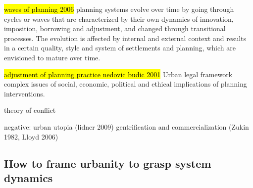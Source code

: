 \documentclass[11pt]{report}
\begin{document}
 	\hl{waves of planning 2006}
planning systems evolve over time by going through cycles or waves that are characterized  by  their  own  dynamics  of  innovation,  imposition,  borrowing  and  adjustment,  and changed through transitional processes. The evolution is affected by internal and external context and results in a certain quality, style and system of settlements and planning, which
are envisioned to mature over time.

\hl{adjustment of planning practice nedovic budic 2001}   
Urban legal framework complex issues of social, economic, political and ethical implications of planning interventions.

theory of conflict

negative:
urban utopia (lidner 2009)
gentrification and commercialization (Zukin 1982, Lloyd 2006)

\subsection{How to frame urbanity to grasp system dynamics}
\end{document}
